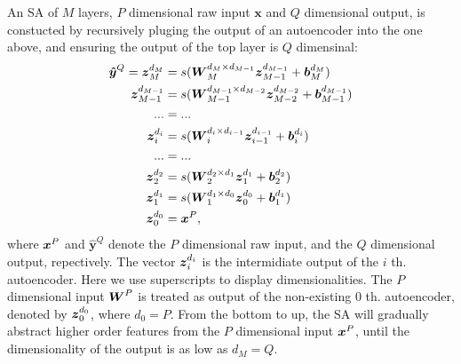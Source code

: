 An SA of $M$ layers, $P$ dimensional raw input $\boldsymbol{x}$ and $Q$ dimensional output, is constucted by recursively pluging the output of an autoencoder into the one above, and ensuring the output of the top layer is $Q$ dimensinal:
\begin{equation} \label{eq:SA}
  \begin{split}
    \boldsymbol{\hat{y}}^Q        =
    \boldsymbol{z}_{M  }^{d_{M  }}         &= s(\boldsymbol{W}_{M  }^{d_{M  } \times d_{M-1}} \boldsymbol{z}_{M-1}^{d_{M-1}} + \boldsymbol{b}_{M  }^{d_{M  }}) \\
    \boldsymbol{z}_{M-1}^{d_{M-1}}         &= s(\boldsymbol{W}_{M-1}^{d_{M-1} \times d_{M-2}} \boldsymbol{z}_{M-2}^{d_{M-2}} + \boldsymbol{b}_{M-1}^{d_{M-1}}) \\
    ... &= ... \\
    \boldsymbol{z}_{i  }^{d_{i  }}         &= s(\boldsymbol{W}_{i  }^{d_{i  } \times d_{i-1}} \boldsymbol{z}_{i-1}^{d_{i-1}} + \boldsymbol{b}_{i  }^{d_{i  }}) \\
    ... &= ... \\
    \boldsymbol{z}_{2  }^{d_{2  }}         &= s(\boldsymbol{W}_{2  }^{d_{2  } \times d_{1  }} \boldsymbol{z}_{1  }^{d_{1  }} + \boldsymbol{b}_{2  }^{d_{2  }}) \\
    \boldsymbol{z}_{1  }^{d_{1  }}         &= s(\boldsymbol{W}_{1  }^{d_{1  } \times d_{0  }} \boldsymbol{z}_{0  }^{d_{0  }} + \boldsymbol{b}_{1  }^{d_{1  }}) \\
    \boldsymbol{z}_{0  }^{d_{0  }}         &= \boldsymbol{x}^P ,
  \end{split}
\end{equation}
where $\boldsymbol{x}^P$ and $\boldsymbol{\hat{y}}^Q$ denote the $P$ dimensional raw input, and the $Q$ dimensional output, repectively. The vector $\boldsymbol{z}_i^{d_i}$ is the intermidiate output of the $i$ th. autoencoder. Here we use superscripts to display dimensionalities. The $P$ dimensional input $\boldsymbol{W}^P$ is treated as output of the non-existing $0$ th. autoencoder, denoted by $\boldsymbol{z}_0^{d_0}$, where $d_0=P$. From the bottom to up, the SA will gradually abstract higher order features from the $P$ dimensional input $\boldsymbol{x}^P$, until the dimensionality of the output is as low as $d_M=Q$.

